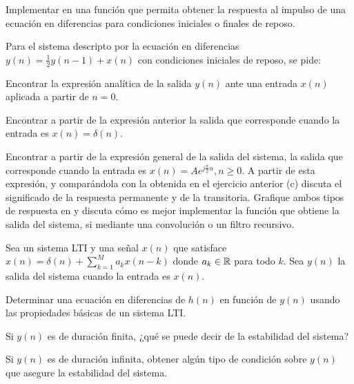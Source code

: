\begin{ejercicio}
    Implementar en \Keyboardsym una función que permita obtener la respuesta al impulso de una ecuación en diferencias para condiciones iniciales o finales de reposo.
\end{ejercicio}
    
\begin{ejercicio}
    Para el sistema descripto por la ecuación en diferencias $y(n) = \frac{1}{2} y(n-1) + x(n)$ con condiciones iniciales de reposo, se pide:
    
    \inciso Encontrar la expresión analítica de la salida $y(n)$ ante una entrada $x(n)$ aplicada a partir de $n = 0$.
    
    \inciso Encontrar a partir de la expresión anterior la salida que corresponde cuando la entrada es $x(n) = \delta(n)$. 
    
    \inciso Encontrar a partir de la expresión general de la salida del sistema, la salida que corresponde
    cuando la entrada es $x(n) = A e^{j\frac{\pi}{2}n}, n \geq 0$. A partir de esta expresión, y
    comparándola con la obtenida en el ejercicio anterior (c) discuta el significado de la respuesta permanente y de la transitoria. Grafique ambos tipos de respuesta en \Keyboard \hspace*{0.1em} y discuta cómo es mejor implementar la función que obtiene la salida del sistema, si mediante una convolución o un filtro recursivo.
\end{ejercicio}

\begin{ejercicio}
    Sea un sistema LTI y una señal $x(n)$ que satisface $x(n)= \delta(n) + \sum_{k=1}^M a_k x(n-k)$ donde $a_k \in \mathbb{R}$ para todo $k$. Sea $y(n)$ la salida del sistema cuando la entrada es $x(n)$.
    
    \inciso Determinar una ecuación en diferencias de $h(n)$ en función de $y(n)$ usando las propiedades básicas de un sistema LTI. 

    \inciso Si $y(n)$ es de duración finita, ¿qué se puede decir de la estabilidad del sistema?

    \inciso Si $y(n)$ es de duración infinita, obtener algún tipo de condición sobre $y(n)$ que asegure la estabilidad del sistema. 
\end{ejercicio}

